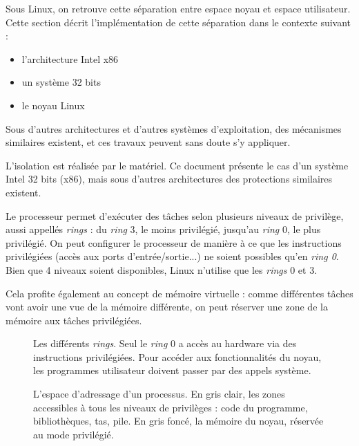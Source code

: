 Sous Linux, on retrouve cette séparation entre espace noyau et espace
utilisateur. Cette section décrit l'implémentation de cette séparation dans le
contexte suivant :

\begin{itemize}
\item l'architecture Intel x86
\item un système 32 bits
\item le noyau Linux
\end{itemize}

Sous d'autres architectures et d'autres systèmes d'exploitation, des mécanismes
similaires existent, et ces travaux peuvent sans doute s'y appliquer.

L'isolation est réalisée par le matériel. Ce document présente le cas d'un
système Intel 32 bits (x86), mais sous d'autres architectures des protections
similaires existent.

Le processeur permet d'exécuter des tâches selon plusieurs niveaux de privilège,
aussi appellés \emph{rings} : du \emph{ring} 3, le moins privilégié, jusqu'au
\emph{ring} 0, le plus privilégié. On peut configurer le processeur de manière à
ce que les instructions privilégiées (accès aux ports d'entrée/sortie...) ne
soient possibles qu'en \emph{ring 0}. Bien que 4 niveaux soient disponibles,
Linux n'utilise que les \emph{rings} 0 et 3.

Cela profite également au concept de mémoire virtuelle : comme différentes
tâches vont avoir une vue de la mémoire différente, on peut réserver une zone de
la mémoire aux tâches privilégiées.

\begin{figure}



\caption{Les différents \emph{rings}. Seul le \emph{ring} 0 a accès au hardware
via des instructions privilégiées. Pour accéder aux fonctionnalités du noyau,
les programmes utilisateur doivent passer par des appels système.}

\label{fig:rings}
\end{figure}

\begin{figure}
\centering
\fbox{
  
}

\caption{L'espace d'adressage d'un processus. En gris clair, les zones
accessibles à tous les niveaux de privilèges : code du programme, bibliothèques,
tas, pile. En gris foncé, la mémoire du noyau, réservée au mode privilégié.}

\label{fig:memmap}
\end{figure}

